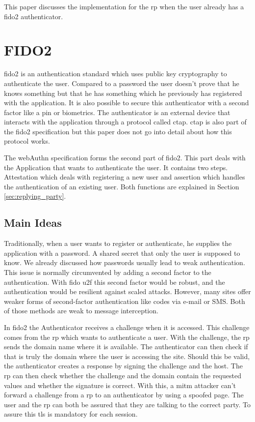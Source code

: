 \documentclass[a4paper, 11pt]{scrartcl}
\begin{document}
This paper discusses the implementation for the \gls{rp} when the user already has a \gls{fido2} authenticator.

\section{FIDO2}

\gls{fido2} is an authentication standard which uses public key cryptography to authenticate the user. Compared to a password the user doesn't prove that he knows something but that he has something which he previously has registered with the application. It is also possible to secure this authenticator with a second factor like a pin or biometrics. The authenticator is an external device that interacts with the application through a protocol called \gls{ctap}. \gls{ctap} is also part of the \gls{fido2} specification but this paper does not go into detail about how this protocol works. \cite{ctap}

The \gls{webAuthn} specification forms the second part of \gls{fido2}. This part deals with the Application that wants to authenticate the user. It contains two steps. Attestation which deals with registering a new user and assertion which handles the authentication of an existing user. Both functions are explained in Section \ref{sec:replying_party}.

\subsection{Main Ideas}

Traditionally, when a user wants to register or authenticate, he supplies the application with a password. A shared secret that only the user is supposed to know. We already discussed how passwords usually lead to weak authentication. This issue is normally circumvented by adding a second factor to the authentication. With \gls{fido} \gls{u2f} this second factor would be robust, and the authentication would be resilient against scaled attacks. However, many sites offer weaker forms of second-factor authentication like codes via e-mail or SMS. Both of those methods are weak to message interception. \cite{smsweak}

In \gls{fido2} the Authenticator receives a challenge when it is accessed. This challenge comes from the \gls{rp} which wants to authenticate a user. With the challenge, the \gls{rp} sends the domain name where it is available. The authenticator can then check if that is truly the domain where the user is accessing the site. Should this be valid, the authenticator creates a response by signing the challenge and the host. The \gls{rp} can then check whether the challenge and the domain contain the requested values and whether the signature is correct. With this, a \gls{mitm} attacker can't forward a challenge from a \gls{rp} to an authenticator by using a spoofed page. The user and the \gls{rp} can both be assured that they are talking to the correct party. To assure this \gls{tls} is mandatory for each session. \cite{yubico:whatIsFido2}
\end{document}
